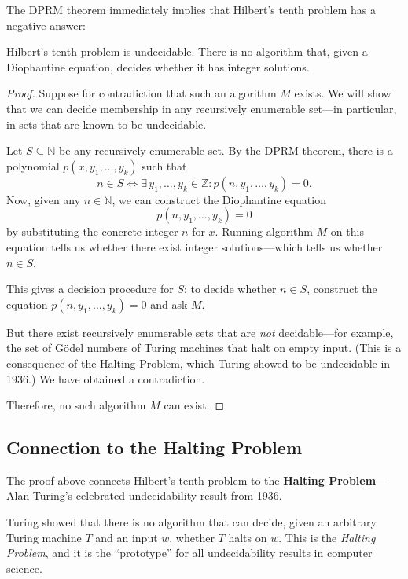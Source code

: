 The DPRM theorem immediately implies that Hilbert's tenth problem has a negative answer:

\begin{theorem}[Matiyasevich, 1970]\label{thm:matiyasevich}
Hilbert's tenth problem is undecidable. There is no algorithm that, given a Diophantine equation, decides whether it has integer solutions.
\end{theorem}

\begin{proof}
Suppose for contradiction that such an algorithm $M$ exists. We will show that we can decide membership in any recursively enumerable set---in particular, in sets that are known to be undecidable.

Let $S \subseteq \mathbb{N}$ be any recursively enumerable set. By the DPRM theorem, there is a polynomial $p(x, y_1, \ldots, y_k)$ such that
\[
    n \in S \iff \exists\, y_1, \ldots, y_k \in \mathbb{Z} : p(n, y_1, \ldots, y_k) = 0.
\]
Now, given any $n \in \mathbb{N}$, we can construct the Diophantine equation
\[
    p(n, y_1, \ldots, y_k) = 0
\]
by substituting the concrete integer $n$ for $x$. Running algorithm $M$ on this equation tells us whether there exist integer solutions---which tells us whether $n \in S$.

This gives a decision procedure for $S$: to decide whether $n \in S$, construct the equation $p(n, y_1, \ldots, y_k) = 0$ and ask $M$.

But there exist recursively enumerable sets that are \emph{not} decidable---for example, the set of Gödel numbers of Turing machines that halt on empty input. (This is a consequence of the Halting Problem, which Turing showed to be undecidable in 1936.) We have obtained a contradiction.

Therefore, no such algorithm $M$ can exist.
\end{proof}

\subsection{Connection to the Halting Problem}

The proof above connects Hilbert's tenth problem to the \textbf{Halting Problem}---Alan Turing's celebrated undecidability result from 1936.

Turing showed that there is no algorithm that can decide, given an arbitrary Turing machine $T$ and an input $w$, whether $T$ halts on $w$. This is the \emph{ Halting Problem}, and it is the ``prototype'' for all undecidability results in computer science.


